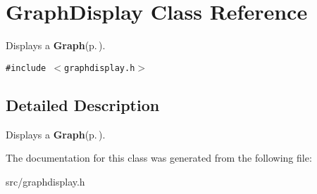 \section{Graph\-Display Class Reference}
\label{classGraphDisplay}
Displays a {\bf Graph}{\rm (p.\,\pageref{classGraph})}.  


{\tt \#include $<$graphdisplay.h$>$}



\subsection{Detailed Description}
Displays a {\bf Graph}{\rm (p.\,\pageref{classGraph})}. 



The documentation for this class was generated from the following file:\begin{CompactItemize}
\item 
src/graphdisplay.h\end{CompactItemize}
